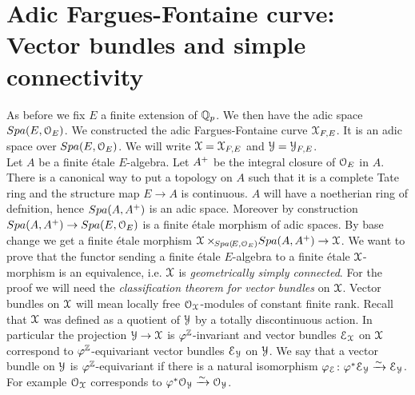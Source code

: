 \section{Adic Fargues-Fontaine curve: Vector bundles and simple connectivity}
As before we fix $E$ a finite extension of $\mathbb{Q}_p$. We then have the adic space ${Spa({E},{\mathcal{O}_E})}$.
We constructed the adic Fargues-Fontaine curve $\mathcal{X}_{F,E}$.
It is an adic space over ${Spa({E},{\mathcal{O}_E})}$.
We will write $\mathcal{X}=\mathcal{X}_{F,E}$ and $\mathcal{Y}=\mathcal{Y}_{F,E}$.\\



Let $A$ be a finite \'etale $E$-algebra. Let $A{^{+}}$ be the integral closure of $\mathcal{O}_E$ in $A$. There is a canonical way to put a topology on $A$ such that it is a complete Tate ring and the structure map $E\to A$ is continuous. 
$A$ will have a noetherian ring of defnition, hence ${Spa({A},{A{^{+}}})}$ is an adic space.  Moreover  by construction ${Spa({A},{A{^{+}}})}\to{Spa({E},{\mathcal{O}_E})}$ is a finite \'etale morphism of adic spaces. By base change we get a finite \'etale morphism $\mathcal{X}\times\!\!_{{Spa({\!E},{\mathcal{O}_E})}}{Spa({A},{A{^{+}}})}\to\mathcal{X}$. We want to prove that the functor sending a finite \'etale $E$-algebra to a finite \'etale $\mathcal{X}$-morphism is an equivalence, i.e. $\mathcal{X}$ is \emph{geometrically simply connected}.
For the proof we will need the \emph{classification theorem for vector bundles} on $\mathcal{X}$.
Vector bundles on $\mathcal{X}$ will mean locally free $\mathcal{O}_{\mathcal{X}}$-modules of constant finite rank.
Recall that  $\mathcal{X}$ was defined as a quotient of $\mathcal{Y}$ by a totally discontinuous action. In particular the projection
$\mathcal{Y}\to \mathcal{X}$ is $\varphi^{\mathbb{Z}}$-invariant and
vector bundles $\mathcal{E}_{\mathcal{X}}$ on $\mathcal{X}$ correspond to
$\varphi^{\mathbb{Z}}$-equivariant vector bundles  $\mathcal{E}_{\mathcal{Y}}$ on $\mathcal{Y}$. We say that a vector bundle on $\mathcal{Y}$ is $\varphi^{\mathbb{Z}}$-equivariant
if there is a natural isomorphism $\varphi_{\mathcal{E}}\colon\varphi^\ast\mathcal{E}_{\mathcal{Y}}\xrightarrow{\sim}\mathcal{E}_{\mathcal{Y}}$. For example $\mathcal{O}_{\mathcal{X}}$ corresponds to $\varphi^\ast\mathcal{O}_{\mathcal{Y}}\xrightarrow{\sim}\mathcal{O}_{\mathcal{Y}}$. \\

